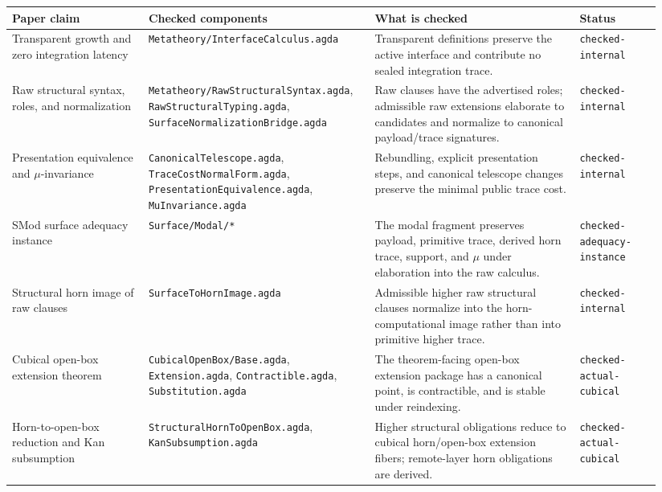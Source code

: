 \begin{center}
\scriptsize
\setlength{\tabcolsep}{2pt}
\begin{tabular}{p{0.20\linewidth}p{0.32\linewidth}p{0.30\linewidth}p{0.12\linewidth}}
\hline
Paper claim & Checked components & What is checked & Status \\
\hline
Transparent growth and zero integration latency
& \texttt{Metatheory/InterfaceCalculus.agda}
& Transparent definitions preserve the active interface and contribute no sealed integration
trace. & \texttt{checked-internal} \\
\hline
Raw structural syntax, roles, and normalization
& \texttt{Metatheory/RawStructuralSyntax.agda},
\texttt{RawStructuralTyping.agda}, \texttt{SurfaceNormalizationBridge.agda}
& Raw clauses have the advertised roles; admissible raw extensions elaborate to candidates and
normalize to canonical payload/trace signatures. & \texttt{checked-internal} \\
\hline
Presentation equivalence and \(\mu\)-invariance
& \texttt{CanonicalTelescope.agda}, \texttt{TraceCostNormalForm.agda},
\texttt{PresentationEquivalence.agda}, \texttt{MuInvariance.agda}
& Rebundling, explicit presentation steps, and canonical telescope changes preserve the minimal
public trace cost. & \texttt{checked-internal} \\
\hline
SMod surface adequacy instance
& \texttt{Surface/Modal/*}
& The modal fragment preserves payload, primitive trace, derived horn trace, support, and
\(\mu\) under elaboration into the raw calculus. & \texttt{checked-adequacy-instance} \\
\hline
Structural horn image of raw clauses
& \texttt{SurfaceToHornImage.agda}
& Admissible higher raw structural clauses normalize into the horn-computational image rather
than into primitive higher trace. & \texttt{checked-internal} \\
\hline
Cubical open-box extension theorem
& \texttt{CubicalOpenBox/Base.agda}, \texttt{Extension.agda},
\texttt{Contractible.agda}, \texttt{Substitution.agda}
& The theorem-facing open-box extension package has a canonical point, is contractible, and is
stable under reindexing. & \texttt{checked-actual-cubical} \\
\hline
Horn-to-open-box reduction and Kan subsumption
& \texttt{StructuralHornToOpenBox.agda}, \texttt{KanSubsumption.agda}
& Higher structural obligations reduce to cubical horn/open-box extension fibers; remote-layer
horn obligations are derived. & \texttt{checked-actual-cubical} \\

\end{tabular}
\end{center}
